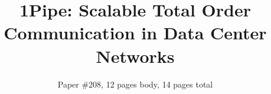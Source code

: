 \documentclass[sigconf]{acmart}
\numberwithin{equation}{section}
\begin{document}
\renewcommand\footnotetextcopyrightpermission[1]{} %


\acmDOI{}

\acmISBN{}


\acmPrice{}

\date{}

\title{1Pipe: Scalable Total Order Communication in Data Center Networks}

\author{Paper \#208, 12 pages body, 14 pages total}

\renewcommand{\shortauthors}{X.et al.}

\maketitle














{\footnotesize

}

%
\end{document}
